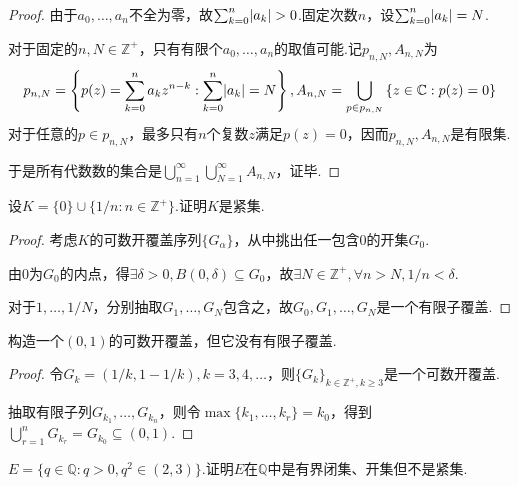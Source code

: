 \begin{proof}
    由于\(a_0, \dots, a_n\)不全为零，故\(\sum_{k=0}^n \abs*{a_k}>0\).固定次数\(n\)，设\(\sum_{k=0}^n \abs*{a_k}=N\).

    对于固定的\(n, N \in \mathbb{Z}^+\)，只有有限个\(a_0, \dots, a_n\)的取值可能.记\(p_{n,N}, A_{n,N}\)为
    \begin{align*}
        p_{n,N}=\left\{p(z)=\sum_{k=0}^n a_k z^{n-k}: \sum_{k=0}^n \abs*{a_k}=N \right\},
        A_{n,N}=\bigcup_{p \in p_{n,N}}\left\{z \in \mathbb{C}: p(z)=0\right\}
    \end{align*}
    对于任意的\(p \in p_{n,N}\)，最多只有\(n\)个复数\(z\)满足\(p(z)=0\)，因而\(p_{n,N}, A_{n,N}\)是有限集.

    于是所有代数数的集合是\(\bigcup_{n=1}^\infty \bigcup_{N=1}^\infty A_{n,N}\)，证毕.
\end{proof}

\newpage

\begin{problem}[12]\label{1.B.12}
    设\(K=\{0\} \cup \{1/n: n \in \mathbb{Z}^+\}\).证明\(K\)是紧集.
\end{problem}

\begin{proof}
    考虑\(K\)的可数开覆盖序列\(\{G_\alpha\}\)，从中挑出任一包含\(0\)的开集\(G_0\).

    由\(0\)为\(G_0\)的内点，得\(\exists \delta>0, B(0,\delta) \subseteq G_0\)，故\(\exists N \in \mathbb{Z}^+, \forall n>N, 1/n<\delta\).

    对于\(1, \dots, 1/N\)，分别抽取\(G_1, \dots, G_N\)包含之，故\(G_0, G_1, \dots, G_N\)是一个有限子覆盖.
\end{proof}

\begin{problem}[13]\label{1.B.13}
    构造一个\((0,1)\)的可数开覆盖，但它没有有限子覆盖.
\end{problem}

\begin{proof}
    令\(G_k=(1/k, 1-1/k), k=3, 4, \dots\)，则\(\{G_k\}_{k \in \mathbb{Z}^+, k \geq 3}\)是一个可数开覆盖.

    抽取有限子列\(G_{k_1}, \dots, G_{k_n}\)，则令\(\max\{k_1, \dots, k_r\}=k_0\)，得到\(\bigcup_{r=1}^n G_{k_r}=G_{k_0} \subseteq (0,1)\).
\end{proof}

\begin{problem}[16]\label{1.B.16}
    \(E=\{q \in \mathbb{Q}: q>0, q^2 \in (2,3)\}\).证明\(E\)在\(\mathbb{Q}\)中是有界闭集、开集但不是紧集.
\end{problem}


